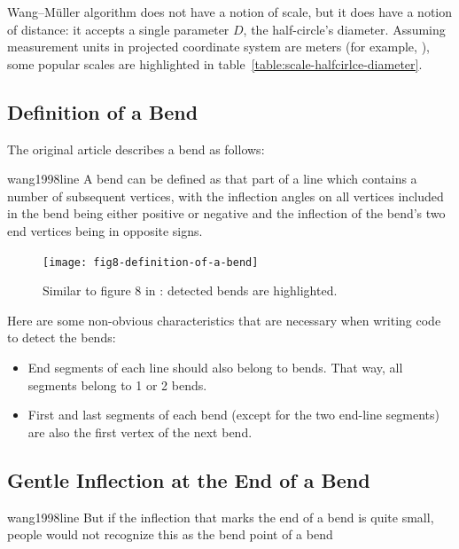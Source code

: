 \documentclass[a4paper]{article}
\newcommand{\titlecite}[1]{\citetitle{#1}\cite{#1}}
\newcommand{\WM}{Wang--M{\"u}ller}
\begin{document}
{\WM} algorithm does not have a notion of scale, but it does have a notion of
distance: it accepts a single parameter $D$, the half-circle's diameter.
Assuming measurement units in projected coordinate system are meters (for
example, \titlecite{epsg3857}), some popular scales are highlighted in
table~\ref{table:scale-halfcirlce-diameter}.

\subsection{Definition of a Bend}
\label{sec:definition-of-a-bend}

The original article describes a bend as follows:

\begin{displaycquote}{wang1998line}
    A bend can be defined as that part of a line which contains a number of
    subsequent vertices, with the inflection angles on all vertices included in
    the bend being either positive or negative and the inflection of the bend's
    two end vertices being in opposite signs.
\end{displaycquote}

\begin{figure}[h!]
    \centering
    \texttt{[image: fig8-definition-of-a-bend]}

    \caption{Similar to figure 8 in \cite{wang1998line}: detected bends are
    highlighted.}

    \label{fig:fig8-definition-of-a-bend}
\end{figure}

Here are some non-obvious characteristics that are necessary when writing code
to detect the bends:

\begin{itemize}
    \item End segments of each line should also belong to bends. That way, all
        segments belong to 1 or 2 bends.

    \item First and last segments of each bend (except for the two end-line
        segments) are also the first vertex of the next bend.
\end{itemize}

\subsection{Gentle Inflection at the End of a Bend}

\begin{displaycquote}{wang1998line}
    But if the inflection that marks the end of a bend is quite small, people
    would not recognize this as the bend point of a bend
\end{displaycquote}
\end{document}
